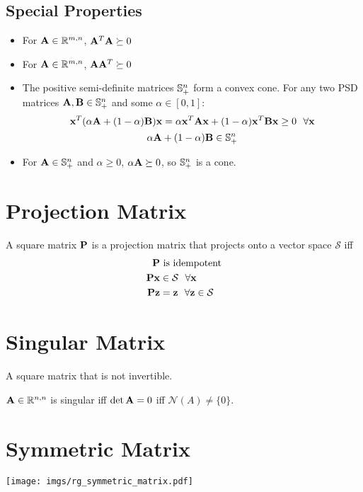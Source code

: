 \subsection*{Special Properties}
\begin{itemize}
\item For $\mathbf{A}\in\mathbb{R}^{m,n}$, $\mathbf{A}^T\mathbf{A}\succeq0$
\item For $\mathbf{A}\in\mathbb{R}^{m,n}$, $\mathbf{A}\mathbf{A}^T\succeq0$
\item The positive semi-definite matrices $\mathbb{S}^n_+$ form a convex cone. For any two PSD matrices $\mathbf{A},\mathbf{B}\in\mathbb{S}^n_+$ and some $\alpha\in[0,1]$:
\begin{equation}
\mathbf{x}^T(\alpha\mathbf{A}+(1-\alpha)\mathbf{B})\mathbf{x}=\alpha \mathbf{x}^T\mathbf{A}\mathbf{x}+(1-\alpha)\mathbf{x}^T\mathbf{B}\mathbf{x}\ge0~~\forall\mathbf{x}
\end{equation}
\begin{equation}
\alpha\mathbf{A}+(1-\alpha)\mathbf{B}\in\mathbb{S}^n_+
\end{equation}
\item For $\mathbf{A}\in\mathbb{S}^n_+$ and $\alpha\ge0$, $\alpha\mathbf{A}\succeq0$, so $\mathbb{S}^n_+$ is a cone.
\end{itemize}



\section{Projection Matrix}
A square matrix $\mathbf{P}$ is a projection matrix that projects onto a vector space $\mathcal{S}$ iff
\begin{align}
\mathbf{P}&~\textrm{is idempotent} \\
\mathbf{P}\mathbf{x}&\in\mathcal{S}~~\forall\mathbf{x} \\
\mathbf{P}\mathbf{z}&=\mathbf{z}~~\forall\mathbf{z}\in\mathcal{S}
\end{align}





\section{Singular Matrix}
A square matrix that is not invertible.

$\mathbf{A}\in\mathbb{R}^{n,n}$ is singular iff $\det \mathbf{A}=0$ iff $\mathcal{N}(A)\ne\{0\}$.


\section{Symmetric Matrix}

\begin{center}
\texttt{[image: imgs/rg\_symmetric\_matrix.pdf]}
\end{center}

